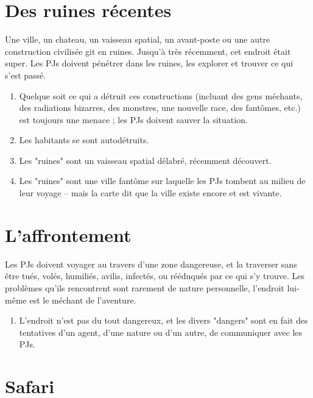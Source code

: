 \begin{multicols}{2}
\section{Des ruines récentes}
\label{ruines}


Une ville, un chateau, un vaisseau spatial, un avant-poste ou une autre construction civilisée git en ruines. Jusqu'à très récemment, cet endroit était super. Les PJs doivent pénétrer dans les ruines, les explorer et trouver ce qui s'est passé.

\themes
\begin{enumerate}
\item Quelque soit ce qui a détruit ces constructions (incluant des gens méchants, des radiations bizarres, des monstres, une nouvelle race, des fantômes, etc.) est toujours une menace ; les PJs doivent sauver la situation.
\item Les habitants se sont autodétruits.
\item Les "ruines" sont un vaisseau spatial délabré, récemment découvert.
\item Les "ruines" sont une ville fantôme sur laquelle les PJs tombent au milieu de leur voyage -- mais la carte dit que la ville existe encore et est vivante.
\end{enumerate}

\section{L'affrontement}
\label{affrontement}


Les PJs doivent voyager au travers d'une zone dangereuse, et la traverser sans être tués, volés, humiliés, avilis, infectés, ou rééduqués par ce qui s'y trouve. Les problèmes qu'ils rencontrent sont rarement de nature personnelle, l'endroit lui-même est le méchant de l'aventure.

\themes
\begin{enumerate}
\item L'endroit n'est pas du tout dangereux, et les divers "dangers" sont en fait des tentatives d'un agent, d'une nature ou d'un autre, de communiquer avec les PJs.

\end{enumerate}
\section{Safari}
\label{safari}


\end{multicols}
